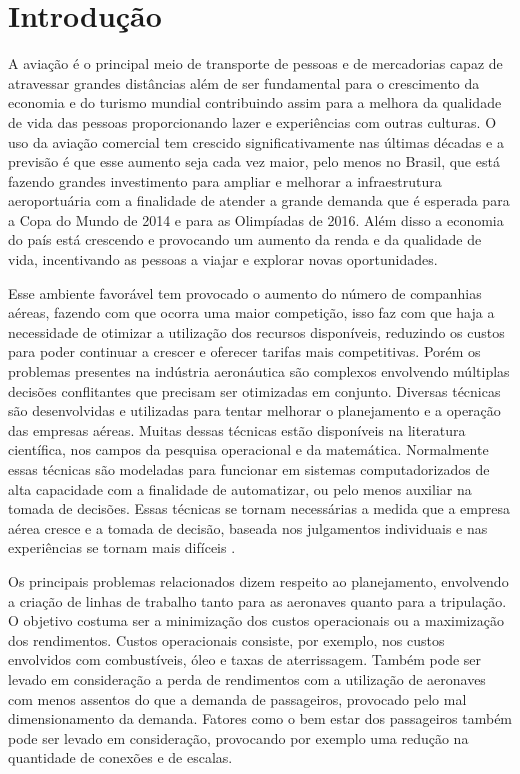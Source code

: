 \chapter{Introdução}
  
 A aviação é o principal meio de transporte de pessoas e de mercadorias capaz
 de atravessar grandes distâncias além de ser fundamental para o crescimento
 da economia e do turismo mundial contribuindo assim para a melhora da
 qualidade de vida das pessoas proporcionando lazer e experiências com outras
 culturas. O uso da aviação comercial tem crescido significativamente nas
 últimas décadas e a previsão é que esse aumento seja cada vez maior, pelo
 menos no Brasil, que está fazendo grandes investimento para ampliar e
 melhorar a infraestrutura aeroportuária com a finalidade de atender a grande
 demanda que é esperada para a Copa do Mundo de 2014 e para as Olimpíadas de
 2016. Além disso a economia do país está crescendo e provocando um aumento da
 renda e da qualidade de vida, incentivando as pessoas a viajar e explorar novas
 oportunidades.

  	
Esse ambiente favorável tem provocado o aumento do número de companhias
aéreas, fazendo com que ocorra uma maior competição, isso faz com que haja a
necessidade de otimizar a utilização dos recursos disponíveis, reduzindo os custos para
poder continuar a crescer e oferecer tarifas mais competitivas. Porém os
problemas presentes na indústria aeronáutica são complexos envolvendo
múltiplas decisões conflitantes que precisam ser otimizadas em conjunto.
Diversas técnicas são desenvolvidas e utilizadas para tentar melhorar o
planejamento e a operação das empresas aéreas. Muitas dessas técnicas estão
disponíveis na literatura científica, nos campos da pesquisa operacional e da
matemática. Normalmente essas técnicas são modeladas para funcionar em sistemas
computadorizados de alta capacidade com a finalidade de automatizar, ou pelo
menos auxiliar na tomada de decisões. Essas técnicas se tornam
necessárias a medida que a empresa aérea cresce e a tomada de decisão,
baseada nos julgamentos individuais e nas experiências se tornam mais
difíceis \cite{ahmed2009}.
  	
  	
Os principais problemas relacionados dizem respeito ao planejamento, envolvendo
a criação de linhas de trabalho tanto para as aeronaves quanto para a
tripulação. O objetivo costuma ser a minimização dos custos operacionais ou a
maximização dos rendimentos. Custos operacionais consiste, por exemplo, nos
custos envolvidos com combustíveis, óleo e taxas de aterrissagem. Também pode
ser levado em consideração a perda de rendimentos com a utilização de aeronaves
com menos assentos do que a demanda de passageiros, provocado pelo mal
dimensionamento da demanda. Fatores como o bem estar dos passageiros também pode
ser levado em consideração, provocando por exemplo uma redução na quantidade de
conexões e de escalas.
	
